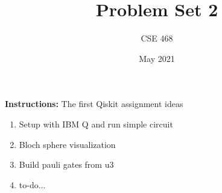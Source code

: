 \documentclass[12pt]{article}
\title{Problem Set 2}
\author{CSE 468}
\date{May 2021}
\begin{document}
\maketitle

\noindent \textbf{Instructions:} The first Qiskit assignment ideas

\begin{enumerate}[font=\bfseries]
    \item Setup with IBM Q and run simple circuit
    \item Bloch sphere visualization
    \item Build pauli gates from u3
    \item to-do...
\end{enumerate}
\end{document}
